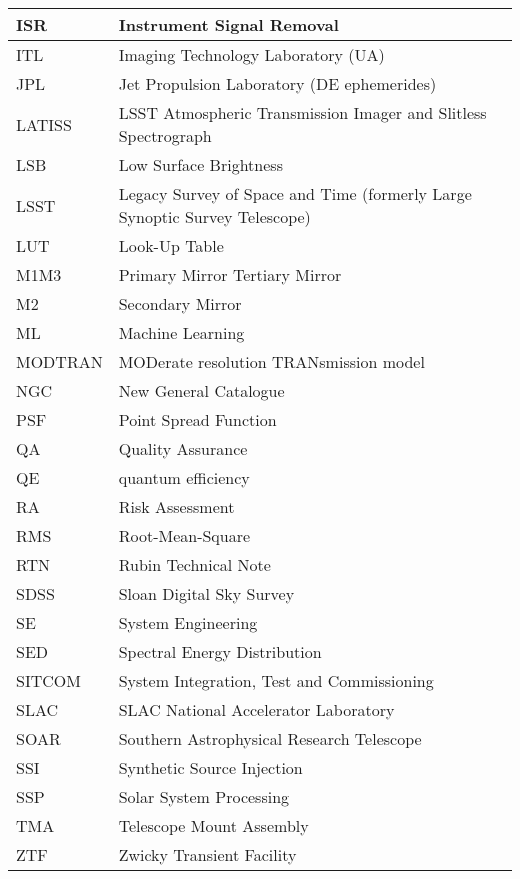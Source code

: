 \begin{longtable}{p{}p{}}
ISR & Instrument Signal Removal \\\hline
ITL & Imaging Technology Laboratory (UA) \\\hline
JPL & Jet Propulsion Laboratory (DE ephemerides) \\\hline
LATISS & LSST Atmospheric Transmission Imager and Slitless Spectrograph \\\hline
LSB & Low Surface Brightness \\\hline
LSST & Legacy Survey of Space and Time (formerly Large Synoptic Survey Telescope) \\\hline
LUT & Look-Up Table \\\hline
M1M3 & Primary Mirror Tertiary Mirror \\\hline
M2 & Secondary Mirror \\\hline
ML & Machine Learning \\\hline
MODTRAN & MODerate resolution TRANsmission model \\\hline
NGC & New General Catalogue \\\hline
PSF & Point Spread Function \\\hline
QA & Quality Assurance \\\hline
QE & quantum efficiency \\\hline
RA & Risk Assessment \\\hline
RMS & Root-Mean-Square \\\hline
RTN & Rubin Technical Note \\\hline
SDSS & Sloan Digital Sky Survey \\\hline
SE & System Engineering \\\hline
SED & Spectral Energy Distribution \\\hline
SITCOM & System Integration, Test and Commissioning \\\hline
SLAC & SLAC National Accelerator Laboratory \\\hline
SOAR & Southern Astrophysical Research Telescope \\\hline
SSI & Synthetic Source Injection \\\hline
SSP & Solar System Processing \\\hline
TMA & Telescope Mount Assembly \\\hline
ZTF & Zwicky Transient Facility \\\hline
\end{longtable}
